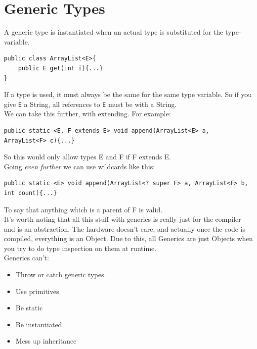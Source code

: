 \documentclass[12pt]{article}
\theoremstyle{definition}
\begin{document}
\section{Generic Types}
A generic type is instantiated when an actual type is substituted for the type-variable.
\\ \linebreak

\begin{lstlisting}
public class ArrayList<E>{
	public E get(int i){...}
}
\end{lstlisting}
If a type is used, it must always be the same for the same type variable. So if you give \texttt{E} a String, all references to \texttt{E} must be with a String.
\\ \linebreak
We can take this further, with extending. For example:
\begin{lstlisting}
public static <E, F extends E> void append(ArrayList<E> a, ArrayList<F> c){...}
\end{lstlisting}
So this would only allow types E and F if F extends E.
\\ \linebreak
Going \textit{even further} we can use wildcards like this:
\begin{lstlisting}
public static <E> void append(ArrayList<? super F> a, ArrayList<F> b, int count){...}
\end{lstlisting}
To say that anything which is a parent of F is valid.
\\ \linebreak
It's worth noting that all this stuff with generics is really just for the compiler and is an abstraction. The hardware doesn't care, and actually once the code is compiled, everything is an Object. Due to this, all Generics are just Objects when you try to do type inspection on them at runtime.
\\ \linebreak
Generics can't:
\begin{itemize}
	\item Throw or catch generic types.
	\item Use primitives
	\item Be static
	\item Be instantiated
	\item Mess up inheritance
\end{itemize}
\end{document}
